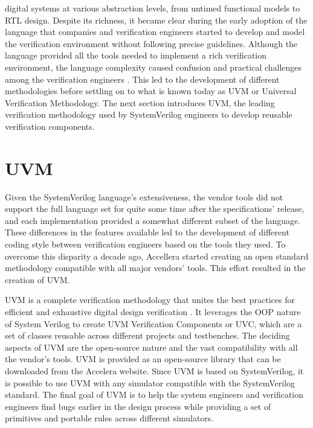 digital systems at various abstraction levels, from untimed functional models to
RTL design. Despite its richness, it became clear during the early adoption of
the language that companies and verification engineers started to develop and
model the verification environment without following precise guidelines.
Although the language provided all the tools needed to implement a rich
verification environment, the language complexity caused confusion and practical
challenges among the verification engineers \cite{bromley2013if}. This led to
the development of different methodologies before settling on to what is known
today as UVM or Universal Verification Methodology. The next section introduces
UVM, the leading verification methodology used by SystemVerilog engineers to
develop reusable verification components.

\section{UVM} \label{sec:uvm}
Given the SystemVerilog language's extensiveness, the vendor tools did not
support the full language set for quite some time after the specifications'
release, and each implementation provided a somewhat different subset of the
language. These differences in the features available led to the development of
different coding style between verification engineers based on the tools they
used. To overcome this disparity a decade ago, Accellera started creating an
open standard methodology compatible with all major vendors' tools. This effort
resulted in the creation of UVM.

\par UVM is a complete verification methodology that unites the best practices
for efficient and exhaustive digital design verification
\cite{methodology20111}. It leverages the OOP nature of System Verilog to create
UVM Verification Components or UVC, which are a set of classes reusable across
different projects and testbenches. The deciding aspects of UVM are the
open-source nature and the vast compatibility with all the vendor's tools. UVM
is provided as an open-source library that can be downloaded from the Accelera
website. Since UVM is based on SystemVerilog, it is possible to use UVM with any
simulator compatible with the SystemVerilog standard. The final goal of UVM is
to help the system engineers and verification engineers find bugs earlier in the
design process while providing a set of primitives and portable rules across
different simulators.


